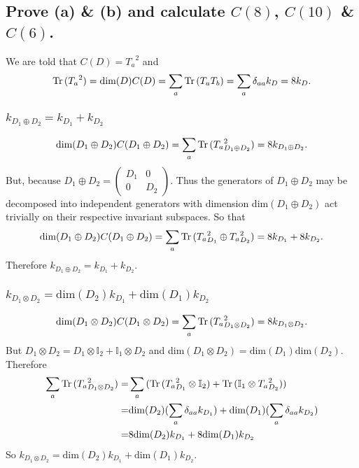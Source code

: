 \documentclass[main.tex]{subfiles}
\begin{document}
\subsection{Prove (a) \& (b) and calculate $C(8)$, $C(10)$ \& $C(6)$.}
We are told that $C(D)={T_a}^2$ and
\begin{equation}
\operatorname{Tr}{({T_a}^2)}=\text{dim}(D)C(D) =\sum_a{\operatorname{Tr}{(T_aT_b)}}=\sum_a{\delta_{aa}k_D}=8k_D.
\end{equation}
\subsubsection{$k_{D_1\oplus D_2}=k_{D_1}+k_{D_2}$}
\begin{equation}
\text{dim}(D_1\oplus D_2)C(D_1\oplus D_2)=\sum_a{\operatorname{Tr}{({T_a}_{D_1\oplus D_2}^{2})}}=8k_{D_1\oplus D_2}.
\end{equation}
But, because $D_1\oplus D_2=\begin{pmatrix}D_1&0\\0&D_2\end{pmatrix}$. Thus the generators of $D_1\oplus D_2$ may be decomposed into independent generators with dimension dim$(D_1\oplus D_2)$ act trivially on their respective invariant subspaces. So that
\begin{equation}
\text{dim}(D_1\oplus D_2)C(D_1\oplus D_2)=\sum_a{\operatorname{Tr}{({T_a}_{D_1}^2\oplus {T_a}_{D_2}^{2})}}=8k_{D_1}+8k_{D_2}.
\end{equation}
Therefore $k_{D_1\oplus D_2}=k_{D_1}+k_{D_2}$.

\subsubsection{$k_{D_1\otimes D_2}=\text{dim}(D_2)k_{D_1}+\text{dim}(D_1)k_{D_2}$}
\begin{equation}
\text{dim}(D_1\otimes D_2)C(D_1\otimes D_2)=\sum_a{\operatorname{Tr}{({T_a}_{D_1\otimes D_2}^{2})}}=8k_{D_1\otimes D_2}.
\end{equation}
But $D_1\otimes D_2=D_1\otimes\mathbb{I}_2+\mathbb{I}_1\otimes D_2$ and dim$(D_1\otimes D_2)=\text{dim}(D_1)\text{dim}(D_2)$.
Therefore
\begin{align}
\sum_a{\operatorname{Tr}{({T_a}_{D_1\otimes D_2}^{2})}}=&\sum_a{(\operatorname{Tr}{({T_a}_{D_1}^2\otimes\mathbb{I}_2)}+\operatorname{Tr}{(\mathbb{I}_1\otimes{T_a}_{D_2}^2)})}\\
=&\text{dim}(D_2)(\sum_a{\delta_{aa}k_{D_1}})+\text{dim}(D_1)(\sum_a{\delta_{aa}k_{D_2}})\\
=&8\text{dim}(D_2)k_{D_1}+8\text{dim}(D_1)k_{D_2}
\end{align}
So $k_{D_1\otimes D_2}=\text{dim}(D_2)k_{D_1}+\text{dim}(D_1)k_{D_2}$.
\end{document}
